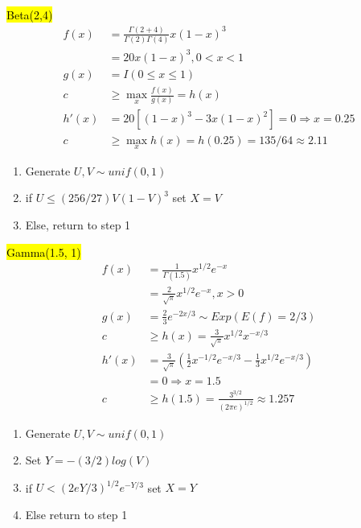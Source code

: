 \documentclass[a4paper,12pt,landscape]{article}
\begin{document}
\begin{multicols}{3}
    \hl{Beta(2,4)}\\
    \begin{align*}
        f(x) &= \frac{\Gamma(2+4)}{\Gamma(2)\Gamma(4)}x(1-x)^3\\
             &= 20x(1-x)^3, 0<x<1\\
            g(x) &= I(0\leq  x \leq 1)\\
            c &\geq \max_x \frac{f(x)}{g(x)} = h(x)\\
            h'(x) &= 20[(1-x)^3 - 3x(1-x)^2]=0 \Rightarrow x = 0.25\\
            c &\geq \max_x h(x) = h(0.25) = 135/64 \approx 2.11
    \end{align*}
    \begin{enumerate}
        \item Generate $U,V\sim unif(0,1)$
        \item if $U \leq (256/27)V(1-V)^3$ set $X = V$
        \item Else, return to step 1
    \end{enumerate}

    \hl{Gamma(1.5, 1)}
    \begin{align*}
        f(x) &= \frac{1}{\Gamma(1.5)}x^{1/2}e^{-x}\\
             &=\frac{2}{\sqrt{\pi}}x^{1/2}e^{-x}, x>0\\
        g(x) &= \frac{2}{3}e^{-2x/3} \sim Exp(E(f) = 2/3)\\
        c &\geq h(x) = \frac{3}{\sqrt{\pi}}x^{1/2}x^{-x/3}\\
        h'(x) &= \frac{3}{\sqrt{\pi}}\left( \frac{1}{2}x^{-1/2}e^{-x/3} - \frac{1}{3}x^{1/2}e^{-x/3}  \right)\\
              &= 0 \Rightarrow x = 1.5\\
        c & \geq h(1.5) = \frac{3^{3/2}}{(2\pi e)^{1/2}}\approx 1.257
    \end{align*}
    \begin{enumerate}
        \item Generate $U, V\sim unif(0,1)$
        \item Set $Y = -(3/2)log(V)$
        \item if $U < (2eY/3)^{1/2}e^{-Y/3}$ set $X=Y$
        \item Else return to step 1
    \end{enumerate}


\end{multicols}
\end{document}
